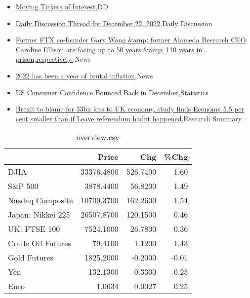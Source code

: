 \documentclass{article}%
\begin{document}
%
\begin{itemize}%
\item%
\href{https://reddit.com/r/wallstreetbets/comments/zsle0b/moving\_tickers\_of\_interest/}{Moving Tickers of Interest},DD%
\item%
\href{https://reddit.com/r/wallstreetbets/comments/zsjfka/daily\_discussion\_thread\_for\_december\_22\_2022/}{Daily Discussion Thread for December 22, 2022},Daily Discussion%
\item%
\href{https://reddit.com/r/wallstreetbets/comments/zsixyb/former\_ftx\_cofounder\_gary\_wang\_former\_alameda/}{Former FTX co-founder Gary Wang \&amp; former Alameda Research CEO Caroline Ellison are facing up to 50 years \&amp; 110 years in prison,respectively.},News%
\item%
\href{https://reddit.com/r/Economics/comments/zsgfsk/2022\_has\_been\_a\_year\_of\_brutal\_inflation/}{2022 has been a year of brutal inflation},News%
\item%
\href{https://reddit.com/r/Economics/comments/zrqx0d/us\_consumer\_confidence\_bounced\_back\_in\_december/}{US Consumer Confidence Bounced Back in December},Statistics%
\item%
\href{https://reddit.com/r/Economics/comments/zro0ec/brexit\_to\_blame\_for\_33bn\_loss\_to\_uk\_economy\_study/}{Brexit to blame for 33bn loss to UK economy, study finds  Economy 5.5 per cent smaller than if Leave referendum hadnt happened},Research Summary%
\end{itemize}%


\begin{table}[htbp]%
\caption{overview.csv}%
\centering%
\begin{adjustbox}{width=1\textwidth}%
\begin{tabular}{lrrr}
\toprule
                  &      Price &      Chg &  \%Chg \\
\midrule
             DJIA & 33376.4800 & 526.7400 &  1.60 \\
          S\&P 500 &  3878.4400 &  56.8200 &  1.49 \\
 Nasdaq Composite & 10709.3700 & 162.2600 &  1.54 \\
Japan: Nikkei 225 & 26507.8700 & 120.1500 &  0.46 \\
     UK: FTSE 100 &  7524.1000 &  26.7800 &  0.36 \\
Crude Oil Futures &    79.4100 &   1.1200 &  1.43 \\
     Gold Futures &  1825.2000 &  -0.2000 & -0.01 \\
              Yen &   132.1300 &  -0.3300 & -0.25 \\
             Euro &     1.0634 &   0.0027 &  0.25 \\
\bottomrule
\end{tabular}
%
\end{adjustbox}%
\end{table}
\end{document}
